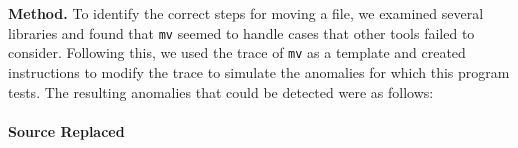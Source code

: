
{\bf Method.}  To identify the correct steps for moving a file, 
we examined several libraries and found that {\tt mv} seemed
to handle cases that other tools failed to consider.  Following this, we 
used the trace of {\tt mv} as a template and created instructions to modify
the trace to simulate the anomalies for which this program tests.
The resulting anomalies that could be detected were as follows:


%

\paragraph{Source Replaced}

